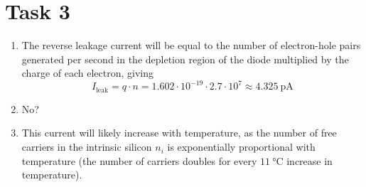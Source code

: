 \documentclass[a4paper,11pt,norsk]{article}
\begin{document}
\section*{Task 3}
\begin{enumerate}
\item The reverse leakage current will be equal to the number of electron-hole pairs generated per second in the depletion region of the diode multiplied by the charge of each electron, giving
\[
    I_{\text{leak}} = q \cdot n = 1.602 \cdot 10^{-19} \cdot 2.7 \cdot 10^{7} \approx \SI{4.325}{\pico\ampere}
\]
\item No?
\item This current will likely increase with temperature, as the number of free carriers in the intrinsic silicon $n_i$ is exponentially proportional with temperature (the number of carriers doubles for every 
    $\SI{11}{\celsius}$ increase in temperature).
\end{enumerate}
\end{document}
